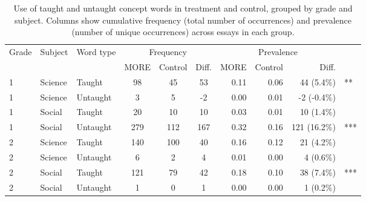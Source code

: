 \begin{table}[ht]
\centering
\caption{Use of taught and untaught concept words in treatment and control,
                    grouped by grade and subject. Columns show cumulative frequency (total number of occurrences) and prevalence
                    (number of unique occurrences) across essays in each group.} 
\label{tab:cwords}
\begin{tabular}{lllcccrrrl}
  \hline
 \multirow{2}{*}{Grade} & \multirow{2}{*}{Subject} & \multirow{2}{*}{Word type} & \multicolumn{3}{c}{Frequency}
                      & \multicolumn{3}{c}{Prevalence}\\ \cline{4-6}\cline{7-9}
 &  &  & MORE & Control & Diff. & MORE & Control & Diff. &  \\ 
  \hline
1 & Science & Taught &  98 &  45 &  53 & 0.11 & 0.06 & 44 (5.4\%) & ** \\ 
  1 & Science & Untaught &   3 &   5 &  -2 & 0.00 & 0.01 & -2 (-0.4\%) &  \\ 
  1 & Social & Taught &  20 &  10 &  10 & 0.03 & 0.01 & 10 (1.4\%) &  \\ 
  1 & Social & Untaught & 279 & 112 & 167 & 0.32 & 0.16 & 121 (16.2\%) & *** \\ 
  2 & Science & Taught & 140 & 100 &  40 & 0.16 & 0.12 & 21 (4.2\%) &  \\ 
  2 & Science & Untaught &   6 &   2 &   4 & 0.01 & 0.00 & 4 (0.6\%) &  \\ 
  2 & Social & Taught & 121 &  79 &  42 & 0.18 & 0.10 & 38 (7.4\%) & *** \\ 
  2 & Social & Untaught &   1 &   0 &   1 & 0.00 & 0.00 & 1 (0.2\%) &  \\ 
   \hline
\end{tabular}
\end{table}
